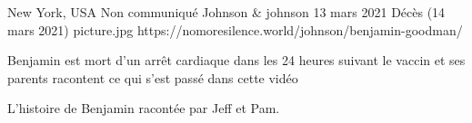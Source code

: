 {New York, USA}
{Non communiqué}
{Johnson \& johnson}
{13 mars 2021}
{Décès (14 mars 2021)}
{picture.jpg}
{https://nomoresilence.world/johnson/benjamin-goodman/}
{

Benjamin est mort d'un arrêt cardiaque dans les 24 heures suivant le vaccin et
ses parents racontent ce qui s'est passé dans cette vidéo

L'histoire de Benjamin racontée par Jeff et Pam.
}
